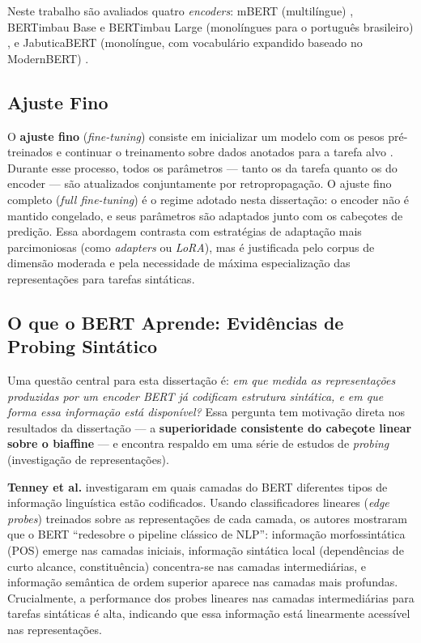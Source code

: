 Neste trabalho são avaliados quatro \textit{encoders}: mBERT (multilíngue)
\cite{devlin2019bert}, BERTimbau Base e BERTimbau Large (monolíngues para o português
brasileiro) \cite{souza2020bertimbau}, e JabuticaBERT (monolíngue, com vocabulário expandido
baseado no ModernBERT) \cite{thiago}.

\subsection{Ajuste Fino}
\label{subsec:finetuning}

O \textbf{ajuste fino} (\textit{fine-tuning}) consiste em inicializar um modelo com os pesos
pré-treinados e continuar o treinamento sobre dados anotados para a tarefa alvo
\cite{devlin2019bert}. Durante esse processo, todos os parâmetros — tanto os da tarefa quanto
os do encoder — são atualizados conjuntamente por retropropagação. O ajuste fino completo
(\textit{full fine-tuning}) é o regime adotado nesta dissertação: o encoder não é mantido
congelado, e seus parâmetros são adaptados junto com os cabeçotes de predição. Essa
abordagem contrasta com estratégias de adaptação mais parcimoniosas (como \textit{adapters}
ou \textit{LoRA}), mas é justificada pelo corpus de dimensão moderada e pela necessidade de
máxima especialização das representações para tarefas sintáticas.

\subsection{O que o BERT Aprende: Evidências de Probing Sintático}
\label{subsec:probing}

Uma questão central para esta dissertação é: \emph{em que medida as representações produzidas
por um encoder BERT já codificam estrutura sintática, e em que forma essa informação está
disponível?} Essa pergunta tem motivação direta nos resultados da dissertação — a
\textbf{superioridade consistente do cabeçote linear sobre o biaffine} — e encontra respaldo
em uma série de estudos de \textit{probing} (investigação de representações).

\textbf{Tenney et al.} \cite{tenney2019bert} investigaram em quais camadas do BERT diferentes
tipos de informação linguística estão codificados. Usando classificadores lineares (\textit{edge
probes}) treinados sobre as representações de cada camada, os autores mostraram que o BERT
``redesobre o pipeline clássico de NLP'': informação morfossintática (POS) emerge nas camadas
iniciais, informação sintática local (dependências de curto alcance, constituência) concentra-se
nas camadas intermediárias, e informação semântica de ordem superior aparece nas camadas mais
profundas. Crucialmente, a performance dos probes lineares nas camadas intermediárias para
tarefas sintáticas é alta, indicando que essa informação está linearmente acessível nas
representações.

